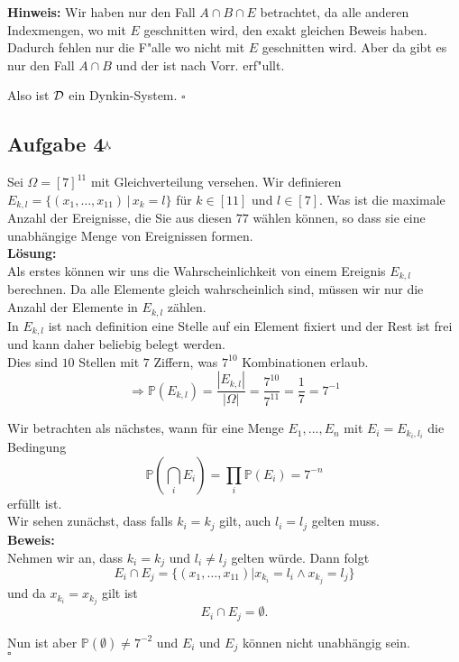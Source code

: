 \documentclass[11pt,a4paper,ngerman]{article}
\newcommand{\Prob}{\mathbb{P}}
\newcommand{\maxw}{$^\curlywedgedownarrow$}
\begin{document}
\textbf{Hinweis:}
Wir haben nur den Fall $A \cap B \cap E$ betrachtet, da alle anderen Indexmengen, wo mit
$E$ geschnitten wird, den exakt gleichen Beweis haben. Dadurch fehlen nur die F"alle wo
nicht mit $E$ geschnitten wird. Aber da gibt es nur den Fall $A \cap B$ und der ist
nach Vorr. erf"ullt.

Also ist $\mathcal{D}$ ein Dynkin-System.
\mbox{} \hfill $\square$

\subsection*{Aufgabe 4\maxw}

Sei $\Omega = [7]^{11}$ mit Gleichverteilung versehen. Wir definieren $E_{k,l} = \{(x_1, \ldots , x_11) \, | \, x_k = l \}$ für $k \in [11]$ und $l \in [7]$.
Was ist die maximale Anzahl der Ereignisse, die Sie aus diesen $77$ wählen können, so dass sie eine unabhängige Menge von Ereignissen formen.\\

\textbf{Lösung:}\\

Als erstes können wir uns die Wahrscheinlichkeit von einem Ereignis $E_{k,l}$ berechnen. Da alle Elemente gleich wahrscheinlich sind,
müssen wir nur die Anzahl der Elemente in $E_{k,l}$ zählen.\\
In $E_{k,l}$ ist nach definition eine Stelle auf ein Element fixiert und der  Rest ist frei und kann daher beliebig belegt werden.\\
Dies sind $10$ Stellen mit $7$ Ziffern, was $7^{10}$ Kombinationen erlaub.
\[
    \Rightarrow \Prob (E_{k,l}) = \frac{|E_{k,l}|}{|\Omega|} = \frac{7^{10}}{7^{11}} = \frac{1}{7} = 7^{-1}
\]

Wir betrachten als nächstes, wann für eine Menge $E_1, ..., E_n$ mit $E_i = E_{k_i, l_i}$ die Bedingung
\[
    \Prob( \bigcap_i E_i) = \prod_i \Prob (E_i) = 7^{-n}
\]
erfüllt ist.\\

Wir sehen zunächst, dass falls $k_i = k_j$ gilt, auch $l_i = l_j$ gelten muss.\\
\textbf{Beweis:}\\
    Nehmen wir an, dass $k_i = k_j$ und $l_i \not= l_j$ gelten würde.
    Dann folgt
    \[
        E_i \cap E_j = \{(x_1, \ldots, x_{11}) | x_{k_i} = l_i \land x_{k_j} = l_j\}
    \]
    und da $x_{k_i} = x_{k_j}$ gilt ist
    \[
        E_i \cap E_j = \emptyset.
    \]

    Nun ist aber $\Prob (\emptyset) \not= 7^{-2}$ und $E_i$ und $E_j$ können nicht unabhängig sein.\\
\mbox{}\hfill$\square$\\
\end{document}
